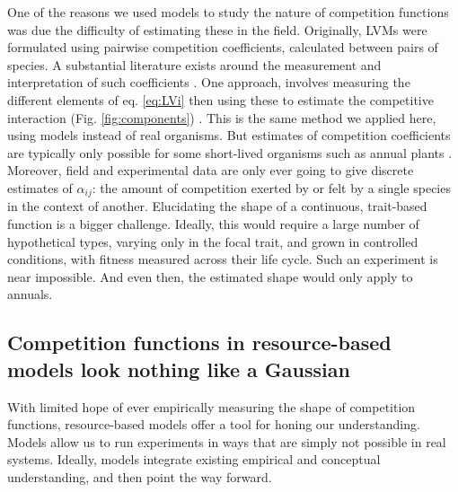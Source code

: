 \documentclass[a4paper,11pt]{article}
\begin{document}
One of the reasons we used models to study the nature of competition functions was due the difficulty of estimating these in the field. Originally, LVMs were formulated using pairwise competition coefficients, calculated between pairs of species. A substantial literature exists around the measurement and interpretation of such coefficients \citep[e.g.]{Ricklefs-1973, Abrams-1980, Law-1997,Freckleton-2001, Kraft-2015}. One approach, involves measuring the different elements of eq. \ref{eq:LVi} then using these to estimate the competitive interaction (Fig. \ref{fig:components}) \citet{Ricklefs-1973}. This is the same method we applied here, using models instead of real organisms. But estimates of competition coefficients are typically only possible for some short-lived organisms such as annual plants \citep{Kraft-2015, Mayfield-2017, Law-1997,Freckleton-2001}. Moreover, field and experimental data are only ever going to give discrete estimates of $\alpha_{ij}$: the amount of competition exerted by or felt by a single species in the context of another. Elucidating the shape of a continuous, trait-based function is a bigger challenge. Ideally, this would require a large number of hypothetical types, varying only in the focal trait, and grown in controlled conditions, with fitness measured across their life cycle. Such an experiment is near impossible. And even then, the estimated shape would only apply to annuals.

\subsection{Competition functions in resource-based models look nothing like a  Gaussian}

With limited hope of ever empirically measuring the shape of competition functions, resource-based models offer a tool for honing our understanding. Models allow us to run experiments in ways that are simply not possible in real systems. Ideally, models integrate existing empirical and conceptual understanding, and then point the way forward.
\end{document}
